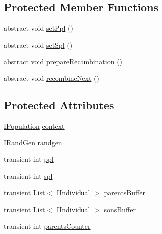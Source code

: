 \subsection*{Protected Member Functions}
\begin{DoxyCompactItemize}
\item 
abstract void \hyperlink{classnet_1_1sf_1_1jclec_1_1base_1_1_abstract_recombinator_aa90f858c27f9da69b2f7bb0a9220ed4e}{set\-Ppl} ()
\item 
abstract void \hyperlink{classnet_1_1sf_1_1jclec_1_1base_1_1_abstract_recombinator_a49a445f27d777d6f439d97d61f2e1729}{set\-Spl} ()
\item 
abstract void \hyperlink{classnet_1_1sf_1_1jclec_1_1base_1_1_abstract_recombinator_ad9518cc41f28166465c4b8dc60059048}{prepare\-Recombination} ()
\item 
abstract void \hyperlink{classnet_1_1sf_1_1jclec_1_1base_1_1_abstract_recombinator_a1f94790294ad036473b5e1ffa563597e}{recombine\-Next} ()
\end{DoxyCompactItemize}
\subsection*{Protected Attributes}
\begin{DoxyCompactItemize}
\item 
\hyperlink{interfacenet_1_1sf_1_1jclec_1_1_i_population}{I\-Population} \hyperlink{classnet_1_1sf_1_1jclec_1_1base_1_1_abstract_recombinator_a580de9e9511dbb1d9042eb1089e767a7}{context}
\item 
\hyperlink{interfacenet_1_1sf_1_1jclec_1_1util_1_1random_1_1_i_rand_gen}{I\-Rand\-Gen} \hyperlink{classnet_1_1sf_1_1jclec_1_1base_1_1_abstract_recombinator_a423dad16f0b307358eb263da316de7a5}{randgen}
\item 
transient int \hyperlink{classnet_1_1sf_1_1jclec_1_1base_1_1_abstract_recombinator_a28f82e20ff940f4ebbe2be58a64adf0a}{ppl}
\item 
transient int \hyperlink{classnet_1_1sf_1_1jclec_1_1base_1_1_abstract_recombinator_acc9ceca89a1680db0a6ec818c1ac2a67}{spl}
\item 
transient List$<$ \hyperlink{interfacenet_1_1sf_1_1jclec_1_1_i_individual}{I\-Individual} $>$ \hyperlink{classnet_1_1sf_1_1jclec_1_1base_1_1_abstract_recombinator_a47b6dacf54a78391075736cc51caf7d1}{parents\-Buffer}
\item 
transient List$<$ \hyperlink{interfacenet_1_1sf_1_1jclec_1_1_i_individual}{I\-Individual} $>$ \hyperlink{classnet_1_1sf_1_1jclec_1_1base_1_1_abstract_recombinator_a8faa0eff785de5bad8b2db01170e6f2e}{sons\-Buffer}
\item 
transient int \hyperlink{classnet_1_1sf_1_1jclec_1_1base_1_1_abstract_recombinator_acfce486c594e8b7e61c304ba7aba00b1}{parents\-Counter}
\end{DoxyCompactItemize}



